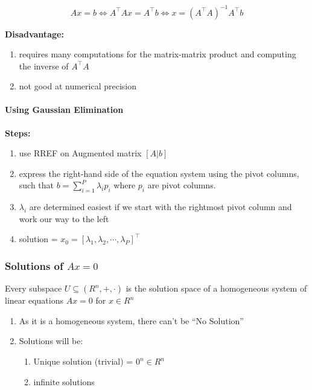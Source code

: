 \[
    Ax = b 
    \Leftrightarrow 
    A^\top Ax = A^\top b 
    \Leftrightarrow
    x = (A^\top A)^{-1}A^\top b
\]

\textbf{Disadvantage:}
\begin{enumerate}
    \item requires many computations for the matrix-matrix product and computing the inverse of $A^\top A$

    \item not good at numerical precision
\end{enumerate}



\paragraph{Using Gaussian Elimination}
\textbf{Steps:}
\begin{enumerate}
    \item use RREF on Augmented matrix $[A|b]$

    \item express the right-hand side of the equation system using the pivot columns, such that ${\displaystyle b = \sum_{i=1}^{P} \lambda_i p_i}$ where $p_i$ are pivot columns.

    \item $\lambda _i$ are determined easiest if we start with the rightmost pivot column and work our way to the left

    \item solution = $x_0 = [\lambda _1, \lambda _2, \cdots, \lambda _P]^\top$
\end{enumerate}

\subsubsection{Solutions of $Ax=0$ \cite{mfml-1}}

Every subspace $U \subseteq (R^n , +, \cdot)$ is the solution space of a homogeneous system of linear equations $Ax = 0$ for $x \in R^n$
\begin{enumerate}
    \item As it is a homogeneous system, there can’t be “No Solution”

    \item Solutions will be:
    \begin{enumerate}
        \item Unique solution (trivial) = $0^n \in R^n$
        \item infinite solutions
    \end{enumerate}
\end{enumerate}


